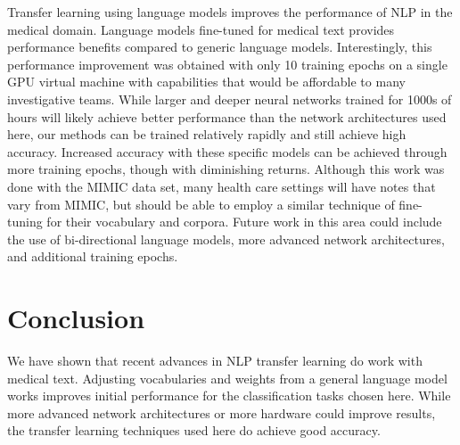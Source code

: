 \documentclass{amia}
\begin{document}
Transfer learning using language models improves the performance of NLP in the medical domain. Language models fine-tuned for medical text provides performance benefits compared to generic language models. Interestingly, this performance improvement was obtained with only 10 training epochs on a single GPU virtual machine with capabilities that would be affordable to many investigative teams. While larger and deeper neural networks trained for 1000s of hours will likely achieve better performance than the network architectures used here, our methods can be trained relatively rapidly and still achieve high accuracy. Increased accuracy with these specific models can be achieved through more training epochs, though with diminishing returns. Although this work was done with the MIMIC data set, many health care settings will have notes that vary from MIMIC, but should be able to employ a similar technique of fine-tuning for their vocabulary and corpora. Future work in this area could include the use of bi-directional language models, more advanced network architectures, and additional training epochs.

\section*{Conclusion}

We have shown that recent advances in NLP transfer learning do work with medical text. Adjusting vocabularies and weights from a general language model works improves initial performance for the classification tasks chosen here. While more advanced network architectures or more hardware could improve results, the transfer learning techniques used here do achieve good accuracy.



\end{document}
